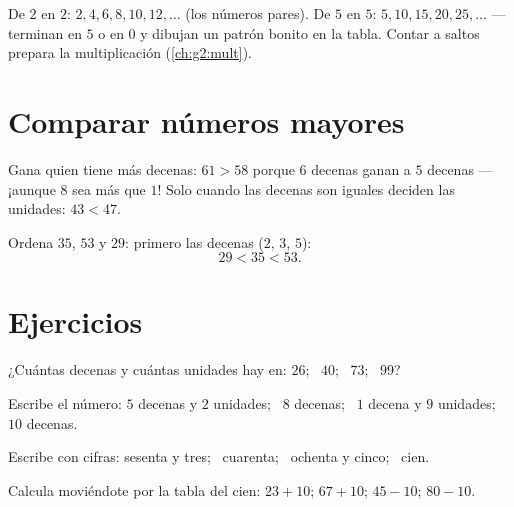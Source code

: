 \begin{example}[Contar de 2 en 2 y de 5 en 5]\label{ex:g1:tens:skip}
De $2$ en $2$: $2, 4, 6, 8, 10, 12, \dots$ (los números pares). De $5$ en $5$:
$5, 10, 15, 20, 25, \dots$ --- terminan en $5$ o en $0$ y dibujan un
patrón bonito en la tabla. Contar a saltos prepara la multiplicación
(\cref{ch:g2:mult}).
\end{example}

\section{Comparar números mayores}

\begin{method}\label{met:g1:tens:compare}
Gana quien tiene más decenas: $61 > 58$ porque $6$ decenas ganan a $5$ decenas ---
¡aunque $8$ sea más que $1$! Solo cuando las decenas son iguales deciden
las unidades: $43 < 47$.
\end{method}

\begin{example}\label{ex:g1:tens:compare}
Ordena $35$, $53$ y $29$: primero las decenas ($2$, $3$, $5$):
\[
29 < 35 < 53 .
\]
\end{example}

\section{Ejercicios}

\begin{exercise}[$\star$]\label{exo:g1:tens:1}
¿Cuántas decenas y cuántas unidades hay en: $26$; \ $40$; \ $73$; \ $99$?
\end{exercise}

\begin{exercise}[$\star$]\label{exo:g1:tens:2}
Escribe el número: $5$ decenas y $2$ unidades; \ $8$ decenas; \ $1$ decena y
$9$ unidades; \ $10$ decenas.
\end{exercise}

\begin{exercise}[$\star$]\label{exo:g1:tens:3}
Escribe con cifras: sesenta y tres; \ cuarenta; \ ochenta y cinco; \ cien.
\end{exercise}

\begin{exercise}[$\star$]\label{exo:g1:tens:4}
Calcula moviéndote por la tabla del cien: $23 + 10$; \quad $67 + 10$;
\quad $45 - 10$; \quad $80 - 10$.
\end{exercise}

